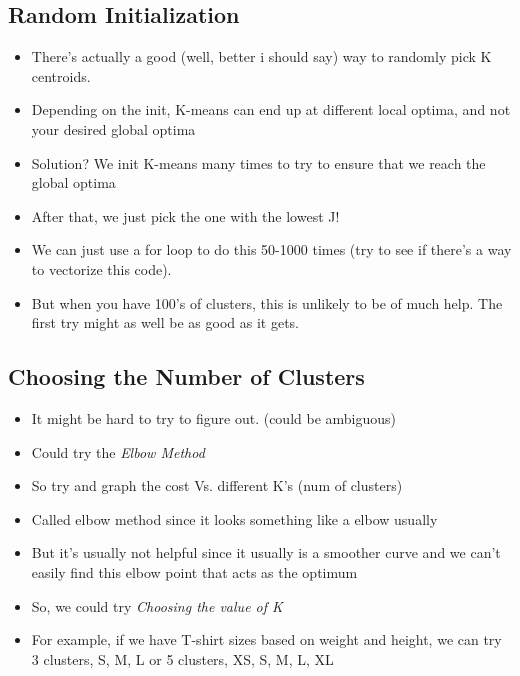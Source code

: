 \documentclass[]{article}
\begin{document}
	\subsection{Random Initialization}
		\begin{itemize}
			\item There's actually a good (well, better i should say) way to randomly pick K centroids.
			\item Depending on the init, K-means can end up at different local optima, and not your desired global optima
			\item Solution? We init K-means many times to try to ensure that we reach the global optima
			\item After that, we just pick the one with the lowest J!
			\item We can just use a for loop to do this 50-1000 times (try to see if there's a way to vectorize this code).
			\item But when you have 100's of clusters, this is unlikely to be of much help. The first try might as well be as good as it gets.
		\end{itemize}
		
	\subsection{Choosing the Number of Clusters}
		\begin{itemize}
			\item It might be hard to try to figure out. (could be ambiguous)
			\item Could try the \emph{Elbow Method}
			\item So try and graph the cost Vs. different K's (num of clusters)
			\item Called elbow method since it looks something like a elbow usually
			\item But it's usually not helpful since it usually is a smoother curve and we can't easily find this elbow point that acts as the optimum
			\item So, we could try \emph{Choosing the value of K}
			\item For example, if we have T-shirt sizes based on weight and height, we can try 3 clusters, S, M, L or 5 clusters, XS, S, M, L, XL
		\end{itemize}
		
\end{document}
